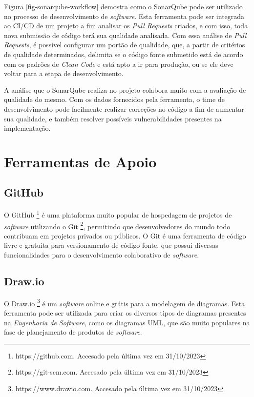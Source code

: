 Figura \ref{fig-sonarqube-workflow} demostra como o SonarQube pode ser utilizado no processo de desenvolvimento de \textit{software}. Esta ferramenta pode 
ser integrada ao CI/CD de um projeto a fim analisar os \textit{Pull Requests} criados, e com isso, toda nova submissão de 
código terá sua qualidade analisada. Com essa análise de \textit{Pull Requests}, é possível configurar um portão de qualidade, 
que, a partir de critérios de qualidade determinados, delimita se o código fonte submetido está de acordo com os padrões de \textit{Clean Code} 
e está apto a ir para produção, ou se ele deve voltar para a etapa de desenvolvimento.

A análise que o SonarQube realiza no projeto colabora muito com a avaliação de qualidade do mesmo. Com os dados fornecidos 
pela ferramenta, o time de desenvolvimento pode facilmente realizar correções no código a fim de aumentar sua qualidade, e 
também resolver possíveis vulnerabilidades presentes na implementação.

\section{Ferramentas de Apoio}

\subsection{GitHub}

O GitHub \footnote{https://github.com. Accesado pela última vez em 31/10/2023} é uma plataforma muito popular de hospedagem de projetos
de \textit{software} utilizando o Git \footnote{https://git-scm.com. Accesado pela última vez em 31/10/2023}, 
permitindo que desenvolvedores do mundo todo contribuam em projetos privados ou públicos. O Git 
é uma ferramenta de código livre e gratuita para versionamento de código fonte, que possui diversas funcionalidades 
para o desenvolvimento colaborativo de \textit{software}.

\subsection{Draw.io}

O Draw.io \footnote{https://www.drawio.com. Accesado pela última vez em 31/10/2023} é um \textit{software} online e grátis para a modelagem de diagramas. 
Esta ferramenta 
pode ser utilizada para criar os diversos tipos de diagramas presentes na \textit{Engenharia de Software}, 
como os diagramas UML, que são muito populares na fase de planejamento de produtos de \textit{software}.



